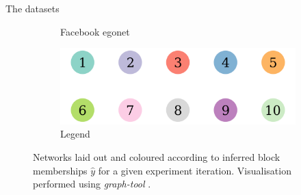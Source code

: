 \documentclass{beamer}
\begin{document}
\begin{frame}{The datasets}
\begin{figure}[!h]
\begin{subfigure}[t]{0.3\linewidth}
				\caption{Facebook egonet}
				\label{fig:fb-graph}
			\end{subfigure}
			\begin{subfigure}[t]{0.11\linewidth}
				\centering
				\includegraphics[width=0.8\linewidth]{10-horizontal-legend.png}
				\caption{Legend}
				\label{fig:10-legend}
			\end{subfigure}
			\caption{Networks laid out and coloured according to inferred block memberships $\hat{y}$ for a given experiment iteration. Visualisation performed using \textit{graph-tool} \cite{peixoto_graph-tool_2014}.}
			\label{fig:graphs-all}
		\end{figure}
	\end{frame}
	
\end{document}
